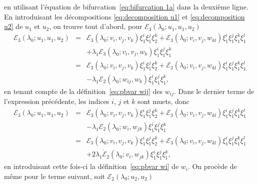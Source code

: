 \documentclass{article}
\newcommand{\nosymbol}{}
\begin{document}
en utilisant l'équation de bifurcation~\eqref{eq:bifurcation 1a} dans la
deuxième ligne. En introduisant les décompositions
\eqref{eq:decomposition u1} et \eqref{eq:decomposition u2} de $u_1$ et $u_2$,
on trouve tout d'abord, pour $\mathcal{E}_3 (\lambda_0 ; u_1, u_1, u_2)$
\begin{eqnarray*}
  \mathcal{E}_3 (\lambda_0 ; u_1, u_1, u_2) & = & \mathcal{E}_3 (\lambda_0 ;
  v_i, v_j, v_k) \xi_1^i \xi_1^j \xi_2^k +\mathcal{E}_3 (\lambda_0 ; v_i, v_j,
  w_{k  l}) \xi_1^i \xi_1^j \xi_1^k \xi_1^l\\
  &  & \nosymbol + \lambda_1 \mathcal{E}_3 (\lambda_0 ; v_i, v_j, w_k)
  \xi_1^i \xi_1^j \xi_1^k\\
  & = & \mathcal{E}_3 (\lambda_0 ; v_i, v_j, v_k) \xi_1^i \xi_1^j \xi_2^k
  +\mathcal{E}_3 (\lambda_0 ; v_i, v_j, w_{k  l}) \xi_1^i \xi_1^j
  \xi_1^k \xi_1^l\\
  &  & \nosymbol - \lambda_1 \mathcal{E}_2 (\lambda_0 ; w_{i  j},
  w_k) \xi_1^i \xi_1^j \xi_1^k,
\end{eqnarray*}
en tenant compte de la définition~\eqref{eq:pbvar wij} des $w_{i
j}$. Dans le dernier terme de l'expression précédente, les indices
$i$, $j$ et $k$ sont muets, donc
\begin{eqnarray*}
  \mathcal{E}_3 (\lambda_0 ; u_1, u_1, u_2) & = & \mathcal{E}_3 (\lambda_0 ;
  v_i, v_j, v_k) \xi_1^i \xi_1^j \xi_2^k +\mathcal{E}_3 (\lambda_0 ; v_i, v_j,
  w_{k  l}) \xi_1^i \xi_1^j \xi_1^k \xi_1^l\\
  &  & \nosymbol - \lambda_1 \mathcal{E}_2 (\lambda_0 ; w_{i }, w_{j
   k}) \xi_1^i \xi_1^j \xi_1^k\\
  & = & \mathcal{E}_3 (\lambda_0 ; v_i, v_j, v_k) \xi_1^i \xi_1^j \xi_2^k
  +\mathcal{E}_3 (\lambda_0 ; v_i, v_j, w_{k  l}) \xi_1^i \xi_1^j
  \xi_1^k \xi_1^l\\
  &  & \nosymbol + 2 \lambda_1  \dot{\mathcal{E}}_2 (\lambda_0 ; v_{i
  }, w_{j  k}) \xi_1^i \xi_1^j \xi_1^k,
\end{eqnarray*}
en introduisant cette fois-ci la définition~\eqref{eq:pbvar wi} de $w_i .$
On procède de même pour le terme suivant, soit $\mathcal{E}_2
(\lambda_0 ; u_2, u_2)$
\end{document}
